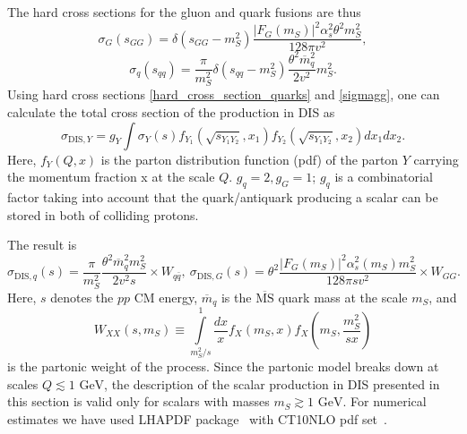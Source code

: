 \documentclass[a4paper,12pt,dvipsnames,usernames]{article}
\begin{document}
The hard cross sections for the gluon and quark fusions are thus
\begin{equation}\label{sigmagg}
    \sigma_{G}(s_{GG})  = 
    \delta(s_{GG} - m_S^2) \frac{|F_{G}(m_{S})|^2 \alpha_s^2 \theta^2 m_S^2}{128\pi v^2},
\end{equation}
\begin{equation}
\label{hard_cross_section_quarks}
    \sigma_{q}(s_{qq}) = 
    \frac{\pi}{m_S^2} 
    \delta(s_{qq} - m_S^2) 
    \frac{\theta^2 \overline{m}_q^2}{2v^2} m_S^2.
\end{equation}
Using hard cross sections \eqref{hard_cross_section_quarks} and \eqref{sigmagg}, one can  calculate the total cross section of the production in DIS as
\begin{equation}
    \sigma_{\text{DIS},Y}=g_{Y}\int \sigma_{Y}(s)f_{Y_{1}}(\sqrt{s_{Y_{1}Y_{2}}},x_{1}) f_{Y_{2}}(\sqrt{s_{Y_{1}Y_{2}}},x_{2}) dx_1 dx_2.
\end{equation}
Here, $f_{Y}(Q,x)$ is the parton distribution function (pdf) of the parton $Y$ carrying the momentum fraction x at the scale $Q$. $g_{q} = 2, g_{G} = 1$; $g_{q}$ is a combinatorial factor taking into account that the quark/antiquark producing a scalar can be stored in both of colliding protons.

The result is
\begin{equation}
    \sigma_{\text{DIS},q} (s) 
    = \frac{\pi}{m_S^2} 
    \frac{\theta^2 \overline{m}_q^2 m_S^2}{2v^2 s}
    \times W_{q\bar{q}}, \ \sigma_{\text{DIS},G} (s) 
    = \theta^{2}\frac{|F_{G}(m_{S})|^{2}\alpha_{s}^{2}(m_{S})m_{S}^{2}}{128\pi sv^{2}}\times W_{GG}.
    \label{eq:dis-cross-sections}
\end{equation}
Here, $s$ denotes the $pp$ CM energy, $\overline{m}_{q}$ is the $\overline{\text{MS}}$ quark mass at the scale $m_{S}$, and
\begin{equation}
 W_{XX}(s,m_{S}) \equiv \int\limits_{m_S^2/s}^1 \frac{dx}{x} f_{X}(m_{S},x) f_{X}\left(m_{S}, \frac{m_S^2}{sx} \right)
 \label{eq:partonic-weight}
\end{equation}
is the partonic weight of the process. Since the partonic model breaks down at scales $Q \lesssim 1\text{ GeV}$, the description of the scalar production in DIS presented in this section is valid only for scalars with masses $m_{S}\gtrsim 1\text{ GeV}$. For numerical estimates we have used LHAPDF package~\cite{Buckley:2014ana} with CT10NLO pdf set~\cite{Lai:2010vv}.
\end{document}
